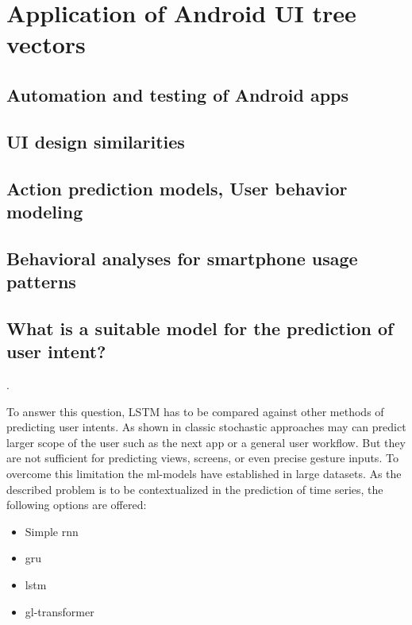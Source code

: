 \chapter{Application of Android UI tree vectors}

\section{Automation and testing of Android apps}
\section{UI design similarities}
\section{Action prediction models, User behavior modeling}
\section{Behavioral analyses for smartphone usage patterns}


\section{What is a suitable model for the prediction of user intent?}.

To answer this question, LSTM has to be compared against other methods of predicting user intents.
As shown in  classic stochastic approaches may can predict larger scope of the user such as the next app or a general user workflow.
But they are not sufficient for predicting views, screens, or even precise gesture inputs.
To overcome this limitation the \gls{ml}-models have established in large datasets.
As the described problem is to be contextualized in the prediction of time series, the following options are offered:
\begin{itemize}
    \item Simple \gls{rnn}
    \item \gls{gru}
    \item \gls{lstm}
    \item \gls{gl-transformer}
\end{itemize}

